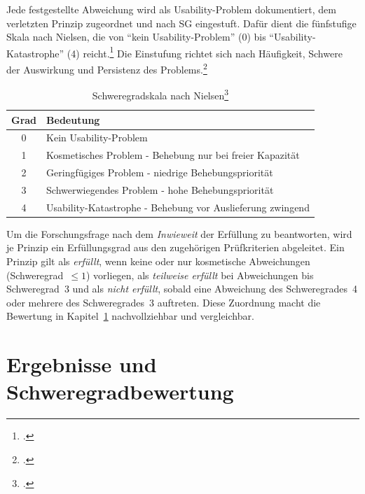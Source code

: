 Jede festgestellte Abweichung wird als Usability-Problem dokumentiert, dem
verletzten Prinzip zugeordnet und nach \ac{SG} eingestuft.
Dafür dient die fünfstufige Skala nach Nielsen, die von
\enquote{kein Usability-Problem} (0) bis \enquote{Usability-Katastrophe} (4)
reicht.\footcite[Vgl.][S.~47]{nielsen1994heuristic}
Die Einstufung richtet sich nach Häufigkeit, Schwere der Auswirkung und
Persistenz des Problems.\footcite[Vgl.][S.~47]{nielsen1994heuristic}

\begin{table}[htbp]
\centering
\caption[Schweregradskala nach Nielsen]{Schweregradskala nach
Nielsen\footcite[Mit Änderungen entnommen aus:][S.~47]{nielsen1994heuristic}}
\label{tab:schweregrade}
\begin{tabularx}{0.98\textwidth}{|c|>{\RaggedRight}X|}
\hline
\textbf{Grad} & \textbf{Bedeutung} \\\hline
0 & Kein Usability-Problem \\\hline
1 & Kosmetisches Problem - Behebung nur bei freier Kapazität \\\hline
2 & Geringfügiges Problem - niedrige Behebungspriorität \\\hline
3 & Schwerwiegendes Problem - hohe Behebungspriorität \\\hline
4 & Usability-Katastrophe - Behebung vor Auslieferung zwingend \\\hline
\end{tabularx}
\end{table}

Um die Forschungsfrage nach dem \emph{Inwieweit} der Erfüllung zu beantworten,
wird je Prinzip ein Erfüllungsgrad aus den zugehörigen Prüfkriterien abgeleitet.
Ein Prinzip gilt als \emph{erfüllt}, wenn keine oder nur kosmetische Abweichungen
(Schweregrad~$\leq 1$) vorliegen, als \emph{teilweise erfüllt} bei Abweichungen
bis Schweregrad~3 und als \emph{nicht erfüllt}, sobald eine Abweichung des
Schweregrades~4 oder mehrere des Schweregrades~3 auftreten.
Diese Zuordnung macht die Bewertung in Kapitel~\ref{section:ergebnisse}
nachvollziehbar und vergleichbar.


\section{Ergebnisse und Schweregradbewertung}
\label{section:ergebnisse}

